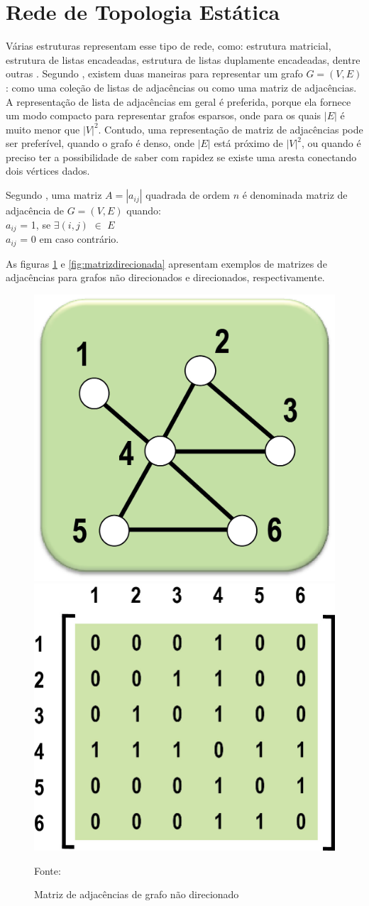 \section{Rede de Topologia Estática}
Várias estruturas representam esse tipo de rede, como: estrutura matricial,
estrutura de listas encadeadas, estrutura de listas duplamente
encadeadas, dentre outras \cite{negreiros}.
Segundo \cite{cormen}, existem duas maneiras para representar um grafo $G = (V,E)$:
como uma coleção de listas de adjacências ou como uma matriz de adjacências. A representação
de lista de adjacências em geral é preferida, porque ela fornece um modo compacto para representar grafos esparsos,
onde para os quais $|E|$ é muito menor que $|V|^2$. Contudo, uma representação de matriz de adjacências pode ser
preferível, quando o grafo é denso, onde $|E|$ está próximo de $|V|^2$, ou quando é preciso ter a possibilidade
de saber com rapidez se existe uma aresta conectando dois vértices dados.

Segundo \cite{goldbarg}, uma matriz $A = |a_{ij}|$ quadrada de ordem $n$ é denominada matriz de adjacência de $G = (V, E)$ quando:\\
\indent $a_{ij}$ = 1, se $\exists(i,j)$ $\in$ $E$\\
\indent $a_{ij}$ = 0 em caso contrário.

As figuras \ref{fig:matriznaodirecionada} e \ref{fig:matrizdirecionada} apresentam exemplos de matrizes de adjacências para
grafos não direcionados e direcionados, respectivamente.

\begin{figure}[htbp]
\centering
 \includegraphics[width=.20\textwidth]{chapters/fig/cal_fig_091a.jpg}
 \includegraphics[width=.25\textwidth]{chapters/fig/cal_fig_091b.jpg}
\caption{Matriz de adjacências de grafo não direcionado}
Fonte: \cite{goldbarg}
\label{fig:matriznaodirecionada}
\end{figure}

